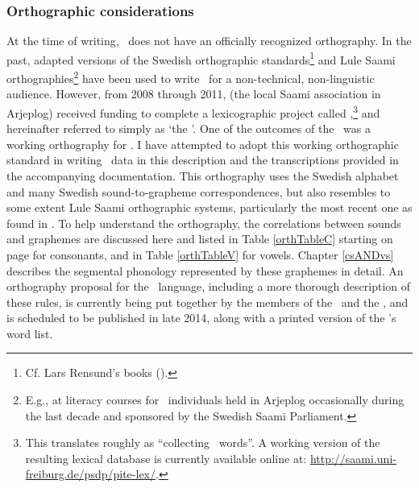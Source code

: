 \subsubsection{Orthographic considerations}\label{orthography}
At the time of writing, \PS\ does not have an officially recognized orthography. In the past, adapted versions of the Swedish orthographic standards\footnote{Cf. Lars Rensund’s books (\citeyear{Rensund1982,Rensund1986}).} 
and Lule Saami orthographies\footnote{E.g., at literacy courses for \PS\ individuals held in Arjeplog occasionally during the last decade and sponsored by the Swedish Saami Parliament.} 
have been used to write \PS\ for a non-technical, non-linguistic audience. However, from 2008 through 2011,  (the local Saami association in Arjeplog) received funding to complete a lexicographic project called ,\footnote{This translates roughly as “collecting \PS\ words”. A working version of the resulting lexical database is currently available online at: \href{http://saami.uni-freiburg.de/psdp/pite-lex/}{http://saami.uni-freiburg.de/psdp/pite-lex/}.} 
\citep[cf.][]{insamlingPS2011} 
and hereinafter referred to simply as ‘the \WLP’. 
One of the outcomes of the \WLP\ was a working orthography for \PS. 
I have attempted to adopt this working orthographic standard in writing \PS\ data in this description and the transcriptions provided in the accompanying documentation. This orthography uses the Swedish alphabet and many Swedish sound-to-grapheme correspondences, but also resembles to some extent Lule Saami orthographic systems, particularly the most recent one as found in \citet{KorhonenO2005}. To help understand the orthography, the correlations between sounds and graphemes are discussed here and listed in Table \ref{orthTableC} starting on page \pageref{orthTableCbegin} for consonants, and in Table \vref{orthTableV} for vowels. %
Chapter \ref{csANDvs} describes the segmental phonology represented by these graphemes in detail. 
An orthography proposal for the \PS\ language, including a more thorough description of these rules, is currently being put together by the members of the \WLP\ and the \PSDP, and is scheduled to be published in late 2014, along with a printed version of the \WLP’s word list.

